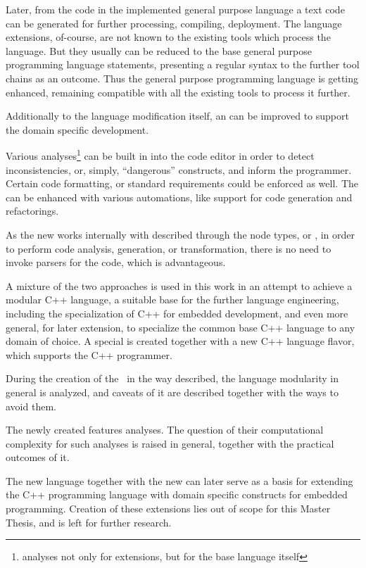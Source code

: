 Later, from the code in the implemented general purpose language a text code can be generated for further processing, 
compiling, deployment. The language extensions, of-course, are not known to the existing tools which process the language.
But they usually can be reduced to the base general purpose programming language statements, presenting a regular 
syntax to the further tool chains as an outcome. Thus the general purpose programming language is getting enhanced,
remaining compatible with all the existing tools to process it further.

Additionally to the language modification itself, an  can be improved to support the domain specific 
development. 

Various analyses\footnote{analyses not only for extensions, but for the base language itself} 
can be built in into the code editor in order to detect inconsistencies, or, simply, ``dangerous'' constructs, 
and inform the programmer. Certain code formatting, or standard requirements could be enforced as well. 
The  can be enhanced with various automations, like support for code generation and refactorings. 

As the new  works internally with  described through the node types, or , in order to perform code
analysis, generation, or transformation, there is no need to invoke parsers for the code, which is advantageous.

A mixture of the two approaches is used in this work in an attempt to achieve a modular C++ language, a suitable base for the 
further language engineering, including the specialization  of C++ for embedded development, and even more general, 
for later extension, to specialize the common base C++ language to any domain of choice. A special  is created 
together with a new C++ language flavor, which supports the C++ programmer.

During the creation of the \cpppl\ in the way described, the language modularity in general is analyzed, and caveats of it
are described together with the ways to avoid them.

The newly created  features analyses. The question of their computational complexity for such analyses 
is raised in general, together with the practical outcomes of it.

The new language together with the new  can later serve as a basis for extending the C++ programming 
language with domain specific constructs for embedded programming. Creation of these extensions lies out of scope
for this Master Thesis, and is left for further research.

